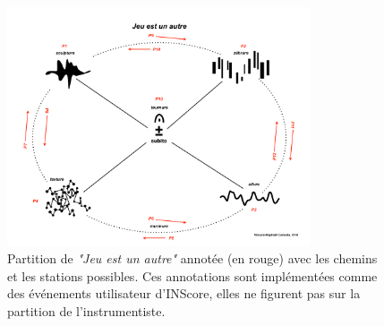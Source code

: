 \documentclass{article}
\begin{document}
\balance




\begin{figure}[ht]
   \centering
   \includegraphics[width=0.8\textwidth]{imgs/jeu}
   \caption{Partition de \emph{"Jeu est un autre"} annotée (en rouge) avec les chemins et les stations possibles. Ces annotations sont implémentées comme des événements utilisateur d'INScore, elles ne figurent pas sur la partition de l'instrumentiste.}
   \label{fig:sample}
\end{figure}
\end{document}
